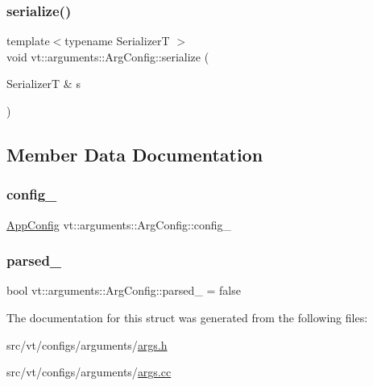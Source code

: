\mbox{\label{structvt_1_1arguments_1_1_arg_config_a518d54185e265211ff1ed9aac08a868d}} 
\subsubsection{\texorpdfstring{serialize()}{serialize()}}
{\footnotesize\ttfamily template$<$typename SerializerT $>$ \\
void vt\+::arguments\+::\+Arg\+Config\+::serialize (\begin{DoxyParamCaption}\item[{SerializerT \&}]{s }\end{DoxyParamCaption})\hspace{0.3cm}{\ttfamily [inline]}}



\subsection{Member Data Documentation}
\mbox{\label{structvt_1_1arguments_1_1_arg_config_af30e0eae1ac1b29f7c85c25636109a9e}} 
\subsubsection{\texorpdfstring{config\+\_\+}{config\_}}
{\footnotesize\ttfamily \hyperlink{structvt_1_1arguments_1_1_app_config}{App\+Config} vt\+::arguments\+::\+Arg\+Config\+::config\+\_\+}

\mbox{\label{structvt_1_1arguments_1_1_arg_config_a710f4894651d38778f924c5d5f340d96}} 
\subsubsection{\texorpdfstring{parsed\+\_\+}{parsed\_}}
{\footnotesize\ttfamily bool vt\+::arguments\+::\+Arg\+Config\+::parsed\+\_\+ = false\hspace{0.3cm}{\ttfamily [private]}}



The documentation for this struct was generated from the following files\+:\begin{DoxyCompactItemize}
\item 
src/vt/configs/arguments/\hyperlink{args_8h}{args.\+h}\item 
src/vt/configs/arguments/\hyperlink{args_8cc}{args.\+cc}\end{DoxyCompactItemize}
